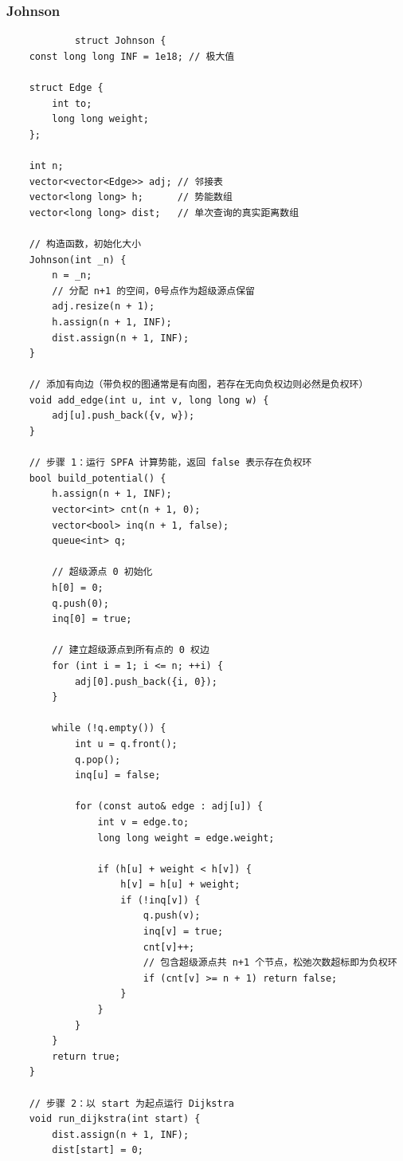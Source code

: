 \documentclass[10pt, a4paper, twocolumn]{article} %
\begin{document}
    \subsubsection{Johnson}
    \begin{lstlisting}
    		struct Johnson {
    const long long INF = 1e18; // 极大值

    struct Edge {
        int to;
        long long weight;
    };

    int n; 
    vector<vector<Edge>> adj; // 邻接表
    vector<long long> h;      // 势能数组
    vector<long long> dist;   // 单次查询的真实距离数组

    // 构造函数，初始化大小
    Johnson(int _n) {
        n = _n;
        // 分配 n+1 的空间，0号点作为超级源点保留
        adj.resize(n + 1);
        h.assign(n + 1, INF);
        dist.assign(n + 1, INF);
    }

    // 添加有向边（带负权的图通常是有向图，若存在无向负权边则必然是负权环）
    void add_edge(int u, int v, long long w) {
        adj[u].push_back({v, w});
    }

    // 步骤 1：运行 SPFA 计算势能，返回 false 表示存在负权环
    bool build_potential() {
        h.assign(n + 1, INF);
        vector<int> cnt(n + 1, 0);
        vector<bool> inq(n + 1, false);
        queue<int> q;

        // 超级源点 0 初始化
        h[0] = 0;
        q.push(0);
        inq[0] = true;

        // 建立超级源点到所有点的 0 权边
        for (int i = 1; i <= n; ++i) {
            adj[0].push_back({i, 0});
        }

        while (!q.empty()) {
            int u = q.front();
            q.pop();
            inq[u] = false;

            for (const auto& edge : adj[u]) {
                int v = edge.to;
                long long weight = edge.weight;

                if (h[u] + weight < h[v]) {
                    h[v] = h[u] + weight;
                    if (!inq[v]) {
                        q.push(v);
                        inq[v] = true;
                        cnt[v]++;
                        // 包含超级源点共 n+1 个节点，松弛次数超标即为负权环
                        if (cnt[v] >= n + 1) return false; 
                    }
                }
            }
        }
        return true;
    }

    // 步骤 2：以 start 为起点运行 Dijkstra
    void run_dijkstra(int start) {
        dist.assign(n + 1, INF);
        dist[start] = 0;


\end{lstlisting}
\end{document}
